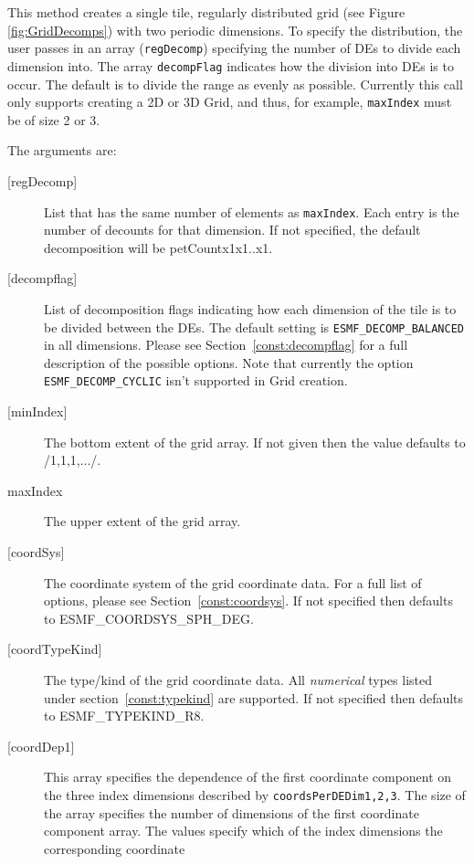   
   This method creates a single tile, regularly distributed grid
   (see Figure \ref{fig:GridDecomps}) with two periodic dimensions.
   To specify the distribution, the user passes in an array
   ({\tt regDecomp}) specifying the number of DEs to divide each
   dimension into. The array {\tt decompFlag} indicates how the division into DEs is to
   occur.  The default is to divide the range as evenly as possible. Currently this call
   only supports creating a 2D or 3D Grid, and thus, for example, {\tt maxIndex} must be of size 2 or 3.
  
   The arguments are:
   \begin{description}
   \item[{[regDecomp]}]
        List that has the same number of elements as {\tt maxIndex}.
        Each entry is the number of decounts for that dimension.
        If not specified, the default decomposition will be petCountx1x1..x1.
   \item[{[decompflag]}]
        List of decomposition flags indicating how each dimension of the
        tile is to be divided between the DEs. The default setting
        is {\tt ESMF\_DECOMP\_BALANCED} in all dimensions. Please see
        Section~\ref{const:decompflag} for a full description of the
        possible options. Note that currently the option
        {\tt ESMF\_DECOMP\_CYCLIC} isn't supported in Grid creation.
   \item[{[minIndex]}]
        The bottom extent of the grid array. If not given then the value defaults
        to /1,1,1,.../.
   \item[maxIndex]
        The upper extent of the grid array.
   \item[{[coordSys]}]
       The coordinate system of the grid coordinate data.
       For a full list of options, please see Section~\ref{const:coordsys}.
       If not specified then defaults to ESMF\_COORDSYS\_SPH\_DEG.
   \item[{[coordTypeKind]}]
       The type/kind of the grid coordinate data. All {\em numerical} types
       listed under section~\ref{const:typekind} are supported.
       If not specified then defaults to ESMF\_TYPEKIND\_R8.
   \item[{[coordDep1]}]
       This array specifies the dependence of the first
       coordinate component on the three index dimensions
       described by {\tt coordsPerDEDim1,2,3}. The size of the
       array specifies the number of dimensions of the first
       coordinate component array. The values specify which
       of the index dimensions the corresponding coordinate

\end{description}
